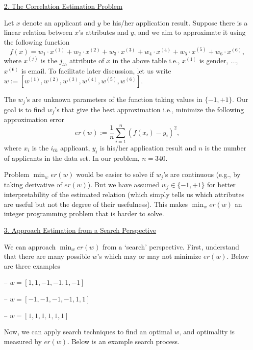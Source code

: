 \documentclass[a4paper, 11pt]{article}
\begin{document}
\vspace{5pt}
\underline{2. The Correlation Estimation Problem}

Let $x$ denote an applicant and $y$ 
be his/her application result. Suppose there 
is a linear relation between $x$'s attributes 
and $y$, and we aim to approximate it using 
the following function 
\begin{equation}
f(x) = w_1 \cdot x^{(1)} + w_2 \cdot x^{(2)} + 
w_3 \cdot x^{(3)} + w_4 \cdot x^{(4)} + w_5 \cdot 
x^{(5)} + w_6 \cdot x^{(6)}, 
\end{equation}
where $x^{(j)}$ is the $j_{th}$ 
attribute of $x$ in the above table i.e., $x^{(1)}$ 
is gender, ..., $x^{(6)}$ is email. To facilitate 
later discussion, let us write 
$w := [w^{(1)}, w^{(2)}, w^{(3)}, 
w^{(4)}, w^{(5)}, w^{(6)}]$. 

The $w_j$'s are unknown parameters of the 
function taking values in $\{-1, +1\}$. 
Our goal is to find $w_j$'s that give the 
best approximation i.e., minimize 
the following approximation error 
\begin{equation}
er(w) := \frac{1}{n} \sum_{i=1}^n (f(x_i) - y_i)^2,   
\end{equation}
where $x_i$ is the $i_{th}$ applicant, 
$y_i$ is his/her application result 
and $n$ is the number of applicants in 
the data set. In our problem, $n = 340$. 

Problem $\min_{w} er(w)$ would be easier to solve 
if $w_j$'s are continuous (e.g., by taking 
derivative of $er(w)$). 
But we have assumed $w_j \in \{-1, +1\}$ 
for better interpretability of the estimated 
relation (which simply tells us which attributes are useful 
but not the degree of their usefulness). 
This makes $\min_{w} er(w)$ an integer programming 
problem that is harder to solve.  

\vspace{5pt}
\underline{3. Approach Estimation from a Search Perspective}

We can approach $\min_{w} er(w)$ from a `search' perspective. 
First, understand that there are many possible $w$'s 
which may or may not minimize $er(w)$. Below are three examples

-- $w = [1, 1, -1, -1, 1, -1]$

-- $w = [-1, -1, -1, -1, 1, 1]$

-- $w = [1, 1, 1, 1, 1, 1]$

Now, we can apply search techniques to find an 
optimal $w$, and optimality is measured by $er(w)$. 
Below is an example search process. 
\end{document}
